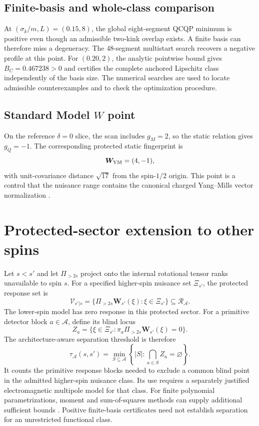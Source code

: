\documentclass[12pt]{iopjournal}
\begin{document}
\subsection{Finite-basis and whole-class comparison}

At $(\sigma_k/m,L)=(0.15,8)$, the global eight-segment QCQP minimum is positive even though an admissible two-kink overlap exists. A finite basis can therefore miss a degeneracy. The $48$-segment multistart search recovers a negative profile at this point. For $(0.20,2)$, the analytic pointwise bound gives $B_C=0.467238>0$ and certifies the complete anchored Lipschitz class independently of the basis size. The numerical searches are used to locate admissible counterexamples and to check the optimization procedure.

\subsection{Standard Model $W$ point}
On the reference $\delta=0$ slice, the scan includes $g_M=2$, so the static relation gives $g_Q=-1$. The corresponding protected static fingerprint is
\begin{equation}
\bm W_{\rm YM}=(4,-1),
\end{equation}
with unit-covariance distance $\sqrt{17}$ from the spin-$1/2$ origin. This point is a control that the nuisance range contains the canonical charged Yang--Mills vector normalization \cite{HagiwaraPecceiZeppenfeldHikasa1987,Haberzettl2019,BrodskyHiller1992}.

\section{Protected-sector extension to other spins}

Let $s<s'$ and let $\Pi_{>2s}$ project onto the internal rotational tensor ranks unavailable to spin $s$. For a specified higher-spin nuisance set $\Xi_{s'}$, the protected response set is
\begin{equation}
\mathcal V_{s'|s}=\{\Pi_{>2s}\bm W_{s'}(\xi):\xi\in\Xi_{s'}\}\subseteq\mathcal R_{\mathcal A}.
\end{equation}
The lower-spin model has zero response in this protected sector. For a primitive detector block $a\in\mathcal A$, define its blind locus
\begin{equation}
Z_a=\{\xi\in\Xi_{s'}:\pi_a\Pi_{>2s}\bm W_{s'}(\xi)=0\}.
\end{equation}
The architecture-aware separation threshold is therefore
\begin{equation}
\tau_{\mathcal A}(s,s')=\min_{S\subseteq\mathcal A}\left\{|S|:\bigcap_{a\in S}Z_a=\varnothing\right\}.
\end{equation}
It counts the primitive response blocks needed to exclude a common blind point in the admitted higher-spin nuisance class. Its use requires a separately justified electromagnetic multipole model for that class. For finite polynomial parametrizations, moment and sum-of-squares methods can supply additional sufficient bounds \cite{Lasserre2001,Parrilo2003}. Positive finite-basis certificates need not establish separation for an unrestricted functional class.
\end{document}
